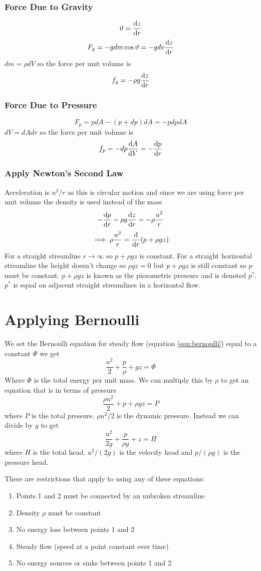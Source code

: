 \documentclass{article}
\begin{document}
    \subsubsection*{Force Due to Gravity}
    \[\vartheta = \dv{z}{r}\]
    \[F_g = -gdm\cos\vartheta = -gdv\dv{z}{r}\]
    \(dm = \rho dV\) so the force per unit volume is
    \[f_g = -\rho g\dv{z}{r}\]
    
    \subsubsection*{Force Due to Pressure}
    \[F_p = pdA - (p + dp)dA = -pdpdA\]
    \(dV = dAdr\) so the force per unit volume is
    \[f_p = -dp\dv{A}{V} = -\dv{p}{r}\]
    
    \subsubsection*{Apply Newton's Second Law}
    Acceleration is \(u^2/r\) as this is circular motion and since we are using force per unit volume the density is used instead of the mass
    \[-\dv{p}{r} - \rho g\dv{z}{r} = -\rho \frac{u^2}{r}\]
    \[\implies \rho \frac{u^2}{r} = \dv{r}(p + \rho g z)\]
    For a straight streamline \(r \to \infty\) so \(p + \rho gz\) is constant.
    For a straight horizontal streamline the height doesn't change so \(\rho g z = 0\) but \(p + \rho g z\) is still constant so \(p\) must be constant.
    \(p + \rho g z\) is known as the piezometric pressure and is denoted \(p^*\).
    \(p^*\) is equal on adjacent straight streamlines in a horizontal flow.
    
    \section{Applying Bernoulli}
    We set the Bernoulli equation for steady flow (equation \ref{eqn:bernoulli}) equal to a constant \(\Phi\) we get
    \[\frac{u^2}{2} + \frac{p}{\rho} + gz = \Phi\]
    Where \(\Phi\) is the total energy per unit mass.
    We can multiply this by \(\rho\) to get an equation that is in terms of pressure
    \[\frac{\rho u^2}{2} + p + \rho g z = P\]
    where \(P\) is the total pressure.
    \(\rho u^2/2\) is the dynamic pressure.
    Instead we can divide by \(g\) to get
    \[\frac{u^2}{2g} + \frac{p}{\rho g} + z = H\]
    where \(H\) is the total head.
    \(u^2/(2g)\) is the velocity head and \(p/(\rho g)\) is the pressure head.
    
    There are restrictions that apply to using any of these equations:
    \begin{enumerate}
        \item Points 1 and 2 must be connected by an unbroken streamline
        \item Density \(\rho\) must be constant
        \item No energy loss between points 1 and 2
        \item Steady flow (speed at a point constant over time)
        \item No energy sources or sinks between points 1 and 2
    \end{enumerate}
    
\end{document}
